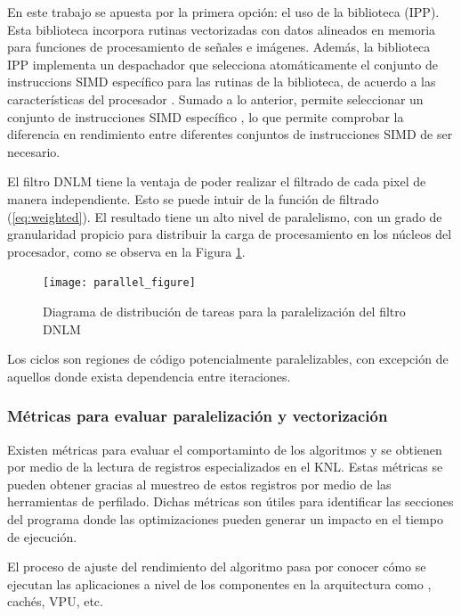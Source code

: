 En este trabajo se apuesta por la primera opción: el uso de la biblioteca  (IPP). Esta biblioteca incorpora rutinas vectorizadas con datos alineados en memoria para funciones de procesamiento de se\~nales e imágenes. Además, la biblioteca IPP implementa un despachador que selecciona atomáticamente el conjunto de instruccions SIMD específico para las rutinas de la biblioteca, de acuerdo a las características del procesador \cite{IntelCorporation2017}.  Sumado a lo anterior, permite seleccionar un conjunto de instrucciones SIMD específico \cite{IntelCorporation2017}, lo que permite comprobar la diferencia en rendimiento entre diferentes conjuntos de instrucciones SIMD de ser necesario.

El filtro DNLM tiene la ventaja de poder realizar el filtrado de cada pixel de manera independiente. Esto se puede intuir de la función de filtrado (\ref{eq:weighted}). El resultado tiene un alto nivel de paralelismo, con un grado de granularidad propicio para distribuir la carga de procesamiento en los núcleos del procesador, como se observa en la Figura \ref{fig:parallel_figure}. 



\begin{figure}[H]
   \centering
   \caption[Diagrama de distribución de tareas paralelas]{Diagrama de distribución de tareas para la paralelización del filtro DNLM}
   \texttt{[image: parallel\_figure]}
   \label{fig:parallel_figure}
 \end{figure}
 
 
 Los ciclos son regiones de código potencialmente paralelizables, con excepción de aquellos donde exista dependencia entre iteraciones. 
 
\subsubsection{Métricas para evaluar paralelización y vectorización}
 
Existen métricas para evaluar el comportaminto de los algoritmos y se obtienen por medio de la lectura de registros especializados en el KNL. Estas métricas se pueden obtener gracias al muestreo de estos registros por medio de las herramientas de perfilado. Dichas métricas son útiles para identificar las secciones del programa donde las optimizaciones pueden generar un impacto en el tiempo de ejecución.

El proceso de ajuste del rendimiento del algoritmo pasa por conocer cómo se ejecutan las aplicaciones a nivel de los componentes en la arquitectura como , cachés, VPU, etc.

